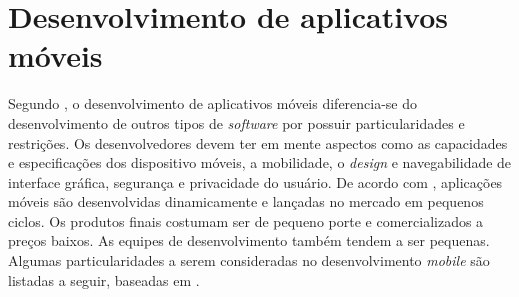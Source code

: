 \chapter{Desenvolvimento de aplicativos móveis} \label{cap:referencialteorico} 

Segundo , o desenvolvimento de aplicativos móveis diferencia-se do desenvolvimento de outros tipos de \textit{software} por possuir particularidades e restrições. Os desenvolvedores devem 
ter em mente aspectos como as capacidades e especificações dos dispositivo móveis, a mobilidade, o \textit{design} e navegabilidade de interface gráfica, segurança e privacidade do usuário. 
De acordo com , aplicações móveis  são desenvolvidas dinamicamente e lançadas no mercado em pequenos ciclos. Os produtos finais costumam ser de pequeno porte e comercializados a preços baixos. 
As equipes de desenvolvimento também tendem a ser pequenas. Algumas particularidades a serem consideradas no desenvolvimento \textit{mobile} são listadas a seguir, baseadas em .

